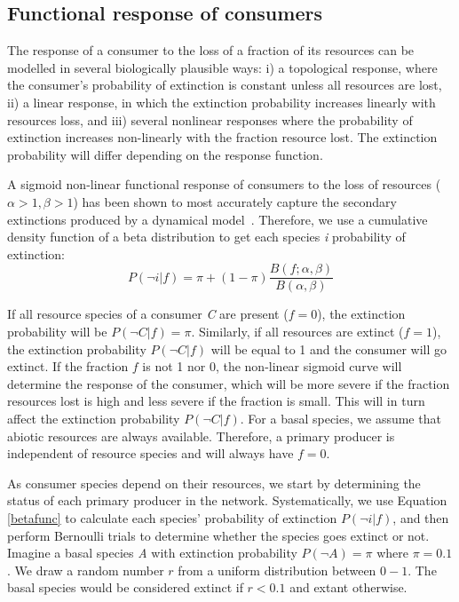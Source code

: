 \documentclass[12pt]{article}
\begin{document}
\begin{spacing}{2.0}
    \subsection{Functional response of consumers}

        The response of a consumer to the loss of a fraction of its resources can be modelled in several biologically plausible ways: i) a topological response, where the consumer's probability of extinction is constant unless all resources are lost, ii) a linear response, in which the extinction probability increases linearly with resources loss, and iii) several nonlinear responses where the probability of extinction increases non-linearly with the fraction resource lost. 
        The extinction probability will differ depending on the response function.
        
        
        A sigmoid non-linear functional response of consumers to the loss of resources ($\alpha >1, \beta >1$) has been shown to most accurately capture the secondary extinctions produced by a dynamical model~\citep{Eklof2013}.
        Therefore, we use a cumulative density function of a beta distribution to get each species \textit{i} probability of extinction:
        \begin{equation}
        \label{betafunc}
        P(\lnot i|f) = \pi + (1 - \pi) \frac{B(f;\alpha,\beta)}{B(\alpha,\beta)}
        \end{equation}
        

        \noindent If all resource species of a consumer \textit{C} are present ($f = 0$), the extinction probability will be $P(\lnot C|f) = \pi$. 
        Similarly, if all resources are extinct ($f = 1$), the extinction probability $P(\lnot C|f)$ will be equal to 1 and the consumer will go extinct.
        If the fraction $f$ is not 1 nor 0, the non-linear sigmoid curve will determine the response of the consumer, which will be more severe if the fraction resources lost is high and less severe if the fraction is small. 
        This will in turn affect the extinction probability $P(\lnot C|f)$. 
        For a basal species, we assume that abiotic resources are always available. 
        Therefore, a primary producer is independent of resource species and will always have $f = 0$.  
        

        As consumer species depend on their resources, we start by determining the status of each primary producer in the network.
        Systematically, we use Equation \ref{betafunc} to calculate each species' probability of extinction $P(\lnot i|f)$, and then perform Bernoulli trials to determine whether the species goes extinct or not. 
        Imagine a basal species \textit{A} with extinction probability $P(\lnot A) = \pi$ where $\pi = 0.1$. 
        We draw a random number $r$ from a uniform distribution between $0-1$.
        The basal species would be considered extinct if $r < 0.1$ and extant otherwise. 
        

\end{spacing}
\end{document}

